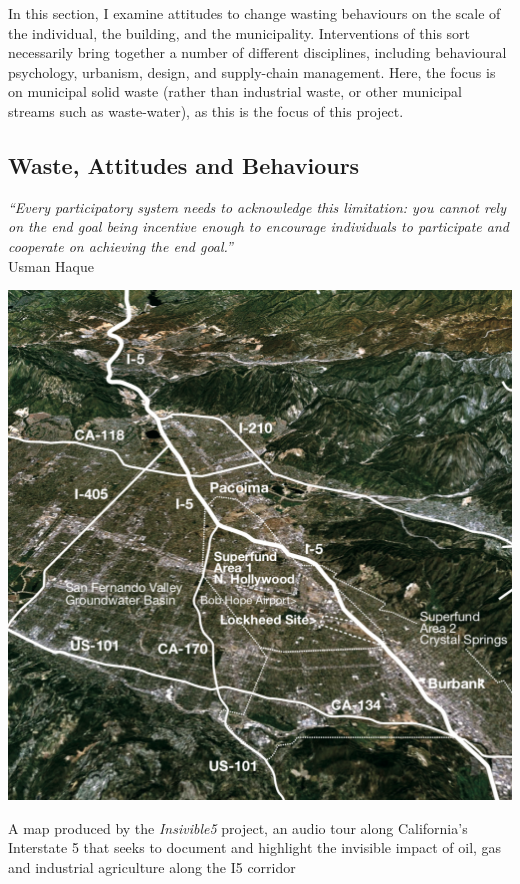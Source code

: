 \documentclass[nofonts,nols,justified,nobib]{tufte-book}
\begin{document}
In this section, I examine attitudes to change wasting behaviours on the scale of the individual, the building, and the municipality. Interventions of this sort necessarily bring together a number of different disciplines, including behavioural psychology, urbanism, design, and supply-chain management. Here, the focus is on municipal solid waste (rather than industrial waste, or other municipal streams such as waste-water), as this is the focus of this project.

\subsection*{Waste, Attitudes and Behaviours}

\begin{flushright}
\emph{``Every participatory system needs to acknowledge this limitation: you cannot
 rely on the end goal being incentive enough to encourage individuals to 
participate and cooperate on achieving the end goal.''} \cite{haque_notes_2008}\\
Usman Haque
\end{flushright}

\begin{marginfigure}
\includegraphics[width=\textwidth]{img/1/invisible5.png}
\caption{A map produced by the \emph{Insivible5} project, an audio tour along California's Interstate 5 that seeks to document and highlight the invisible impact of oil, gas and industrial agriculture along the I5 corridor \cite{balkin_invisible5_2006} }
\end{marginfigure}
\end{document}

